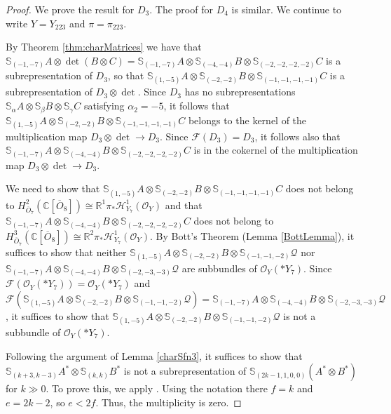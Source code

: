 \documentclass[11pt,reqno]{amsart}
\newcommand{\oo}{\otimes}
\newcommand{\bS}{\mathbb{S}}
\newcommand{\C}{\mathbb{C}}
\renewcommand{\det}{\operatorname{det}}
\newcommand{\mc}[1]{\mathcal{#1}}
\newcommand{\ol}[1]{\overline{#1}}
\numberwithin{equation}{section}
\begin{document}
\begin{proof}
We prove the result for $D_3$. The proof for $D_4$ is similar. We continue to write $Y=Y_{223}$ and $\pi=\pi_{223}$.

By Theorem \ref{thm:charMatrices} we have that $\bS_{(-1,-7)}A\oo \det(B\oo C)=\bS_{(-1,-7)}A\oo \bS_{(-4,-4)}B\oo \bS_{(-2,-2,-2,-2)}C$ is a subrepresentation of $D_3$, so that $\bS_{(1,-5)}A\oo \bS_{(-2,-2)}B\oo \bS_{(-1,-1,-1,-1)}C$	 is a subrepresentation of $D_3\otimes \det$. Since $D_3$ has no subrepresentations $\bS_{\alpha}A\oo \bS_{\beta}B\oo \bS_{\gamma}C$ satisfying $\alpha_2=-5$, it follows that $\bS_{(1,-5)}A\oo \bS_{(-2,-2)}B\oo \bS_{(-1,-1,-1,-1)}C$ belongs to the kernel of the multiplication map $D_3\otimes \det\to D_3$. Since $\mc{F}(D_3)=D_3$, it follows also that $\bS_{(-1,-7)}A\oo\bS_{(-4,-4)}B\oo \bS_{(-2,-2,-2,-2)}C$ is in the cokernel of the multiplication map $D_3\oo\det \to D_3$. 

We need to show that $\bS_{(1,-5)}A\oo \bS_{(-2,-2)}B\oo \bS_{(-1,-1,-1,-1)}C$ does not belong to $H^2_{\ol{O}_7}(\C[\ol{O}_8])\cong \mathbb{R}^1\pi_{\ast}\mathscr{H}^1_{Y_7}(\mc{O}_Y)$ and that $\bS_{(-1,-7)}A\oo\bS_{(-4,-4)}B\oo \bS_{(-2,-2,-2,-2)}C$ does not belong to $H^3_{\ol{O}_7}(\C[\ol{O}_8])\cong \mathbb{R}^2\pi_{\ast}\mathscr{H}^1_{Y_7}(\mc{O}_Y)$. By Bott's Theorem (Lemma \ref{BottLemma}), it suffices to show that neither $\bS_{(1,-5)}A\oo \bS_{(-2,-2)}B\oo \bS_{(-1,-1,-2)}\mc{Q}$ nor $\bS_{(-1,-7)}A\oo \bS_{(-4,-4)}B\oo \bS_{(-2,-3,-3)}\mc{Q}$ are subbundles of $\mc{O}_Y(\ast Y_7)$. Since $\mc{F}(\mc{O}_Y(\ast Y_7))=\mc{O}_Y(\ast Y_7)$ and $\mc{F}(\bS_{(1,-5)}A\oo \bS_{(-2,-2)}B\oo \bS_{(-1,-1,-2)}\mc{Q})=\bS_{(-1,-7)}A\oo \bS_{(-4,-4)}B\oo \bS_{(-2,-3,-3)}\mc{Q}$, it suffices to show that $\bS_{(1,-5)}A\oo \bS_{(-2,-2)}B\oo \bS_{(-1,-1,-2)}\mc{Q}$ is not a subbundle of $\mc{O}_Y(\ast Y_7)$.

Following the argument of Lemma \ref{charSfn3}, it suffices to show that $\bS_{(k+3,k-3)}A^{\ast}\oo \bS_{(k,k)}B^{\ast}$ is not a subrepresentation of $\mathbb{S}_{(2k-1,1,0,0)}(A^{\ast}\oo B^{\ast})$ for $k\gg 0$. To prove this, we apply \cite[Corollary 4.3b]{raicu2012secant}. Using the notation there $f=k$ and $e=2k-2$, so $e<2f$. Thus, the multiplicity is zero.
\end{proof}

	
\end{document}
